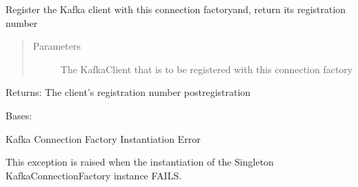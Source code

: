 \documentclass[letterpaper,10pt,english]{sphinxmanual}
\begin{document}
\begin{fulllineitems}

\begin{fulllineitems}
\label{\detokenize{Forge:Forge.KafkaConnectionFactory.register}}
\sphinxAtStartPar
Register the Kafka client with this connection factory\textendash{}and, return its registration number
\begin{quote}\begin{description}
\item[{Parameters}] \leavevmode
\sphinxAtStartPar
{} \textendash{} The KafkaClient that is to be registered with this connection factory

\end{description}\end{quote}

\sphinxAtStartPar
Returns: The client’s registration number post\sphinxhyphen{}registration

\end{fulllineitems}


\end{fulllineitems}


\begin{fulllineitems}
\label{\detokenize{Forge:Forge.KafkaConnectionFactoryInstantiationError}}
\sphinxAtStartPar
Bases: 

\sphinxAtStartPar
Kafka Connection Factory Instantiation Error

\sphinxAtStartPar
This exception is raised when the instantiation of the Singleton KafkaConnectionFactory instance FAILS.

\end{fulllineitems}

\end{document}

